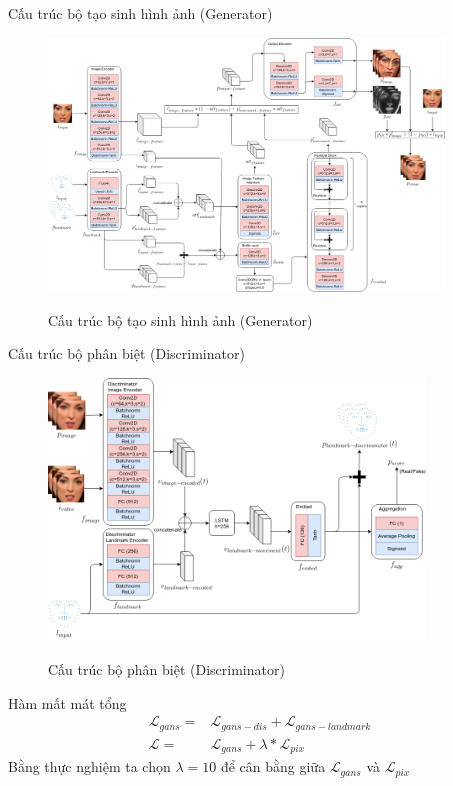 \begin{frame}{Cấu trúc bộ tạo sinh hình ảnh (Generator)}
    \begin{figure}[H]
        \centering
        \includegraphics[width=10.5cm]{images/generator.png}
        \label{fig:generator}
        \caption{Cấu trúc bộ tạo sinh hình ảnh (Generator)}
    \end{figure}
\end{frame}

\begin{frame}{Cấu trúc bộ phân biệt (Discriminator)}
    \begin{figure}[H]
        \centering
        \includegraphics[width=10cm]{images/discriminator.png}
        \label{fig:discriminator}
        \caption{Cấu trúc bộ phân biệt (Discriminator)}
    \end{figure}
\end{frame}

\begin{frame}{Hàm mất mát tổng}
    \begin{equation}
        \begin{split}
        \mathcal{L}_{gans} = &\mathcal{L}_{gans-dis} + \mathcal{L}_{gans-landmark}\\
        \mathcal{L} = &\mathcal{L}_{gans} + \lambda*\mathcal{L}_{pix}
        \end{split}
    \end{equation}
    Bằng thực nghiệm ta chọn $\lambda = 10$ để cân bằng giữa $\mathcal{L}_{gans}$ và $\mathcal{L}_{pix}$
\end{frame}

